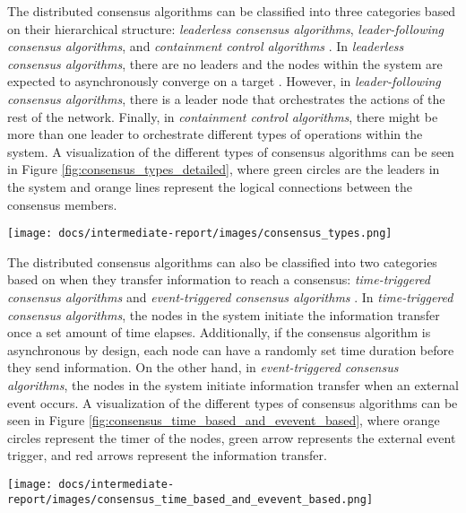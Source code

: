 \documentclass[compsoc]{IEEEtran}
\begin{document}
The distributed consensus algorithms can be classified into three categories based on their hierarchical structure: \emph{leaderless consensus algorithms}, \emph{leader-following consensus algorithms}, and \emph{containment control algorithms} \cite{consensus_systems_survey}. In \emph{leaderless consensus algorithms}, there are no leaders and the nodes within the system are expected to asynchronously converge on a target \cite{Ge_Han_2017}. However, in \emph{leader-following consensus algorithms}, there is a leader node that orchestrates the actions of the rest of the network. Finally, in \emph{containment control algorithms}, there might be more than one leader to orchestrate different types of operations within the system. A visualization of the different types of consensus algorithms can be seen in Figure \ref{fig:consensus_types_detailed}, where green circles are the leaders in the system and orange lines represent the logical connections between the consensus members.

\begingroup
    \centering
    \medskip
    \texttt{[image: docs/intermediate-report/images/consensus\_types.png]}
    \label{fig:consensus_types_detailed}
\endgroup

The distributed consensus algorithms can also be classified into two categories based on when they transfer information to reach a consensus: \emph{time-triggered consensus algorithms} and \emph{event-triggered consensus algorithms} \cite{consensus_systems_survey}. In \emph{time-triggered consensus algorithms}, the nodes in the system initiate the information transfer once a set amount of time elapses. Additionally, if the consensus algorithm is asynchronous by design, each node can have a randomly set time duration before they send information. On the other hand, in \emph{event-triggered consensus algorithms}, the nodes in the system initiate information transfer when an external event occurs. A visualization of the different types of consensus algorithms can be seen in Figure \ref{fig:consensus_time_based_and_evevent_based}, where orange circles represent the timer of the nodes, green arrow represents the external event trigger, and red arrows represent the information transfer.

\begingroup
    \centering
    \medskip
    \texttt{[image: docs/intermediate-report/images/consensus\_time\_based\_and\_evevent\_based.png]}
    \label{fig:consensus_time_based_and_evevent_based}
\endgroup
\end{document}
